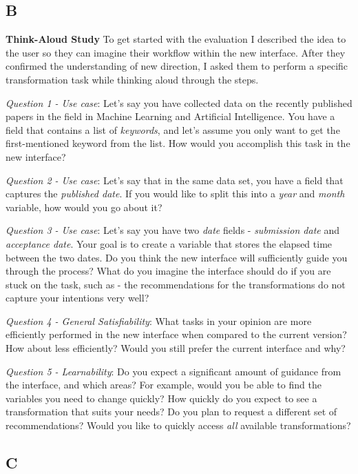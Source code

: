 \documentclass[12pt,letterpaper]{article}
\begin{document}
\subsection*{B}

\textbf{Think-Aloud Study}
To get started with the evaluation I described the idea to the user so they can imagine their workflow within the new interface. After they confirmed the understanding of new direction, I asked them to perform a specific transformation task while thinking aloud through the steps.

\textit{Question 1 - Use case}: Let's say you have collected data on the recently published papers in the field in Machine Learning and Artificial Intelligence. You have a field that contains a list of \textit{keywords}, and let's assume you only want to get the first-mentioned keyword from the list. How would you accomplish this task in the new interface?  

\textit{Question 2 - Use case}: Let's say that in the same data set, you have a field that captures the \textit{published date}. If you would like to split this into a \textit{year} and \textit{month} variable, how would you go about it?

\textit{Question 3 - Use case}: Let's say you have two \textit{date} fields - \textit{submission date} and \textit{acceptance date}. Your goal is to create a variable that stores the elapsed time between the two dates. Do you think the new interface will sufficiently guide you through the process? What do you imagine the interface should do if you are stuck on the task, such as - the recommendations for the transformations do not capture your intentions very well?   

\textit{Question 4 - General Satisfiability}: What tasks in your opinion are more efficiently performed in the new interface when compared to the current version? How about less efficiently? Would you still prefer the current interface and why? 

\textit{Question 5 - Learnability}: Do you expect a significant amount of guidance from the interface, and which areas? For example, would you be able to find the variables you need to change quickly? How quickly do you expect to see a transformation that suits your needs? Do you plan to request a different set of recommendations? Would you like to quickly access \textit{all} available transformations? 

\subsection*{C}
\end{document}
